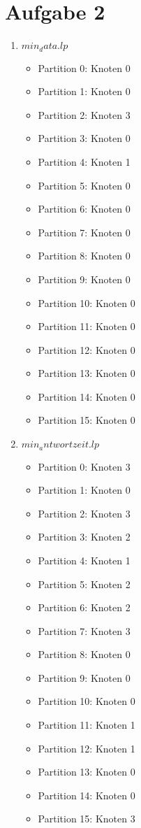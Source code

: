 \documentclass[a4paper]{article}
\begin{document}
\section*{Aufgabe 2}
\begin{enumerate}[label=\alph*)]
\item $ min_data.lp $
\begin{itemize}
\item Partition 0: Knoten 0
\item Partition 1: Knoten 0
\item Partition 2: Knoten 3
\item Partition 3: Knoten 0
\item Partition 4: Knoten 1
\item Partition 5: Knoten 0
\item Partition 6: Knoten 0
\item Partition 7: Knoten 0
\item Partition 8: Knoten 0
\item Partition 9: Knoten 0
\item Partition 10: Knoten 0
\item Partition 11: Knoten 0
\item Partition 12: Knoten 0
\item Partition 13: Knoten 0
\item Partition 14: Knoten 0
\item Partition 15: Knoten 0
\end{itemize}

\item $ min_antwortzeit.lp $
\begin{itemize}
\item Partition 0: Knoten 3
\item Partition 1: Knoten 0
\item Partition 2: Knoten 3
\item Partition 3: Knoten 2
\item Partition 4: Knoten 1
\item Partition 5: Knoten 2
\item Partition 6: Knoten 2
\item Partition 7: Knoten 3
\item Partition 8: Knoten 0
\item Partition 9: Knoten 0
\item Partition 10: Knoten 0
\item Partition 11: Knoten 1
\item Partition 12: Knoten 1
\item Partition 13: Knoten 0
\item Partition 14: Knoten 0
\item Partition 15: Knoten 3
\end{itemize}


\end{enumerate}
\end{document}
